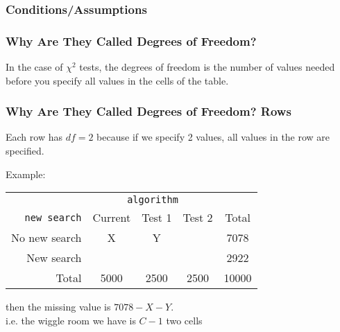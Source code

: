 \documentclass[handout]{beamer}
\newcommand{\blue}[1]{\textcolor{blue2}{#1}}
\begin{document}
\begin{frame}
\frametitle{Conditions/Assumptions}
%
%
\end{frame}


\begin{frame}
\frametitle{Why Are They Called Degrees of Freedom?}

In the case of $\chi^2$ tests, the degrees of freedom is the number of values needed before you specify \blue{all} values in the cells of the table.

\end{frame}


\begin{frame}
\frametitle{Why Are They Called Degrees of Freedom? Rows}

\pause Each row has $df=2$ because if we specify 2 values, all values in the row are specified.  

\vspace{0.5cm}

\pause Example:
\begin{center}
  \begin{tabular}{r|ccc|c}
& \multicolumn{3}{c|}{{\tt algorithm}} & \\
       {\tt new search} & Current & Test 1 & Test 2 & Total \\ 
\hline
    No new search & X & Y &  & 7078 \\ 
    New search &  &  &  & 2922 \\ 
\hline
    Total & 5000 & 2500 & 2500 & 10000 \\ 
  \end{tabular}
\end{center}
\pause
then the missing value is $7078-X-Y$.\\ 
i.e. the \blue{wiggle room} we have is $C-1$ two cells

\end{frame}
\end{document}
